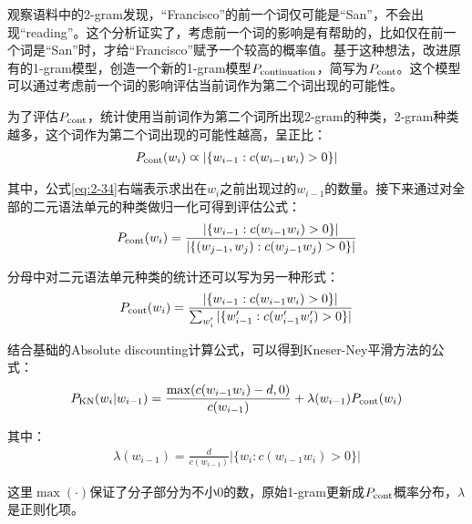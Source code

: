 \parinterval 观察语料中的2-gram发现，“Francisco”的前一个词仅可能是“San”，不会出现“reading”。这个分析证实了，考虑前一个词的影响是有帮助的，比如仅在前一个词是“San”时，才给“Francisco”赋予一个较高的概率值。基于这种想法，改进原有的1-gram模型，创造一个新的1-gram模型${P}_{\textrm{continuation}}$，简写为${P}_{\textrm{cont}}$。这个模型可以通过考虑前一个词的影响评估当前词作为第二个词出现的可能性。

\parinterval 为了评估${P}_{\textrm{cont}}$，统计使用当前词作为第二个词所出现2-gram的种类，2-gram种类越多，这个词作为第二个词出现的可能性越高，呈正比：
\begin{eqnarray}
{P}_{\textrm{cont}}(w_i) \varpropto |\{w_{i-1}: c(w_{i-1} w_i )>0\}|
\label{eq:2-34}
\end{eqnarray}

其中，公式\eqref{eq:2-34}右端表示求出在$w_i$之前出现过的$w_{i-1}$的数量。接下来通过对全部的二元语法单元的种类做归一化可得到评估公式：
\begin{eqnarray}
{P}_{\textrm{cont}}(w_i) = \frac{|\{ w_{i-1}:c(w_{i-1} w_i )>0 \}|}{|\{ (w_{j-1},w_j):c(w_{j-1} w_j )>0 \}|}
\label{eq:2-35}
\end{eqnarray}

\parinterval 分母中对二元语法单元种类的统计还可以写为另一种形式：
\begin{eqnarray}
{P}_{\textrm{cont}}(w_i) = \frac{|\{ w_{i-1}:c(w_{i-1} w_i )>0 \}|}{\sum_{w^{\prime}_{i}}|\{ w_{i-1}^{\prime}:c(w_{i-1}^{\prime} w_i^{\prime} )>0 \}|}
\label{eq:2-36}
\end{eqnarray}

\parinterval 结合基础的Absolute discounting计算公式，可以得到Kneser-Ney平滑方法的公式：
\begin{eqnarray}
{P}_{\textrm{KN}}(w_i|w_{i-1}) = \frac{\max(c(w_{i-1} w_i )-d,0)}{c(w_{i-1})}+ \lambda(w_{i-1}){P}_{\textrm{cont}}(w_i)
\label{eq:2-37}
\end{eqnarray}

\noindent 其中：
\begin{eqnarray}
\lambda(w_{i-1}) = \frac{d}{c(w_{i-1})}|\{w_i:c(w_{i-1} w_i)>0\}|
\label{eq:2-38}
\end{eqnarray}

\noindent 这里$\max(\cdot)$保证了分子部分为不小0的数，原始1-gram更新成${P}_{\textrm{cont}}$概率分布，$\lambda$是正则化项。


